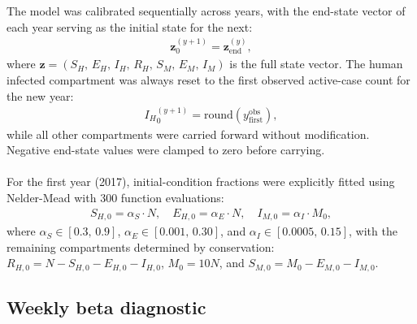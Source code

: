 \documentclass[a4paper,fleqn]{cas-dc}
\begin{document}
The model was calibrated sequentially across years, with the end-state vector of each year serving as the initial state for the next:
\begin{align}
\mathbf{z}_0^{(y+1)} = \mathbf{z}_{\mathrm{end}}^{(y)},
\label{eq:chain}
\end{align}
where $\mathbf{z} = (S_H,\, E_H,\, I_H,\, R_H,\, S_M,\, E_M,\, I_M)$ is the full state vector. The human infected compartment was always reset to the first observed active-case count for the new year:
\begin{align}
{I_H}^{(y+1)}_0 = \mathrm{round}\!\left(y^{\mathrm{obs}}_{\text{first}}\right),
\label{eq:ih_reset}
\end{align}
while all other compartments were carried forward without modification. Negative end-state values were clamped to zero before carrying.
\\\\
For the first year (2017), initial-condition fractions were explicitly fitted using Nelder-Mead with 300 function evaluations:
\begin{align}
S_{H,0} = \alpha_S \cdot N, \quad E_{H,0} = \alpha_E \cdot N, \quad I_{M,0} = \alpha_I \cdot M_0,
\label{eq:ic_fitted}
\end{align}
where $\alpha_S \in [0.3,\, 0.9]$, $\alpha_E \in [0.001,\, 0.30]$, and $\alpha_I \in [0.0005,\, 0.15]$, with the remaining compartments determined by conservation: $R_{H,0} = N - S_{H,0} - E_{H,0} - I_{H,0}$, $M_0 = 10N$, and $S_{M,0} = M_0 - E_{M,0} - I_{M,0}$.

\subsection{Weekly beta diagnostic}
\label{sec:weekly_beta_diagnostic}
\end{document}
